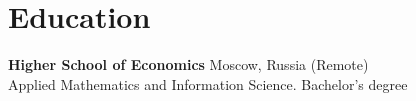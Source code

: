\section{\sc Education}

\textbf{Higher School of Economics} \hfill Moscow, Russia (Remote) \\
Applied Mathematics and Information Science. \hfill Bachelor's degree\\

\endinput
